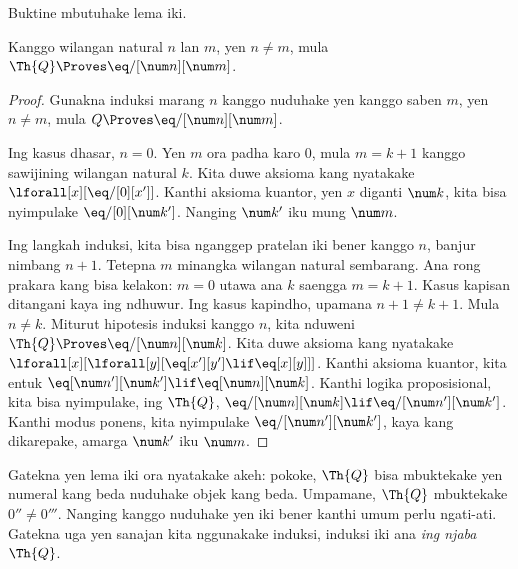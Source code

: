 \documentclass[../../../include/open-logic-section]{subfiles}
\begin{document}
Buktine mbutuhake lema iki.

\begin{lem}
 Kanggo wilangan natural $n$ lan $m$, yen $n
\neq m$, mula $\Th{Q} \Proves \eq/[\num n][\num m]$.
\end{lem}

\begin{proof}
Gunakna induksi marang $n$ kanggo nuduhake yen kanggo saben $m$, yen
$n \neq m$, mula $Q \Proves \eq/[\num n][\num m]$.

Ing kasus dhasar, $n = 0$. Yen $m$ ora padha karo $0$, mula $m = k +
1$ kanggo sawijining wilangan natural $k$. Kita duwe aksioma kang nyatakake
$\lforall[x][\eq/[0][x']]$. Kanthi aksioma kuantor, yen $x$ diganti
  $\num k$, kita bisa nyimpulake $\eq/[0][\num k']$. Nanging $\num k'$
  iku mung $\num m$.

Ing langkah induksi, kita bisa nganggep pratelan iki bener kanggo $n$,
banjur nimbang $n+1$. Tetepna $m$ minangka wilangan natural sembarang. Ana rong
prakara kang bisa kelakon: $m = 0$ utawa ana $k$ saengga $m = k+1$. Kasus kapisan
ditangani kaya ing ndhuwur. Ing kasus kapindho, upamana $n+1 \neq
k+1$. Mula $n \neq k$. Miturut hipotesis induksi kanggo $n$, kita nduweni
$\Th{Q} \Proves \eq/[\num n][\num k]$. Kita duwe aksioma kang nyatakake
$\lforall[x][\lforall[y][\eq[x'][y'] \lif \eq[x][y]]]$. Kanthi
aksioma kuantor, kita entuk $\eq[\num n'][\num k'] \lif \eq[\num n][\num
  k]$. Kanthi logika proposisional, kita bisa nyimpulake, ing $\Th{Q}$,
$\eq/[\num n][\num k] \lif \eq/[\num n'][\num k']$. Kanthi modus
ponens, kita nyimpulake $\eq/[\num n'][\num k']$, kaya kang dikarepake,
amarga $\num k'$ iku $\num m$.
\end{proof}

\begin{explain}
Gatekna yen lema iki ora nyatakake akeh: pokoke, $\Th{Q}$ bisa
mbuktekake yen numeral kang beda nuduhake objek kang beda. Umpamane,
$\Th{Q}$ mbuktekake $0'' \neq 0'''$. Nanging kanggo nuduhake yen iki
bener kanthi umum perlu ngati-ati. Gatekna uga yen sanajan kita
nggunakake induksi, induksi iki ana \emph{ing njaba} $\Th{Q}$.
\end{explain}
\end{document}
